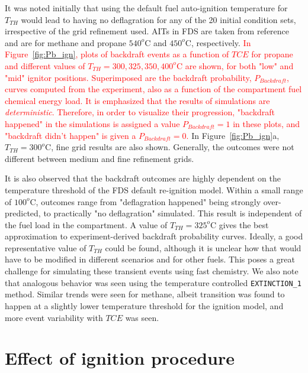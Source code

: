 \documentclass[12pt,letterpaper]{article}
\begin{document}
\begin{flushleft}
It was noted initially that using the default fuel auto-ignition temperature for $T_{TH}$ would lead to having no deflagration for any of the 20 initial condition sets, irrespective of the grid refinement used. AITs in FDS are taken from reference~\cite{SFPE:Beyler} and are for methane and propane $540^o$C and $450^o$C, respectively. 
\textcolor{red}{In Figure~\ref{fig:Pb_ign}, plots of backdraft events as a function of $TCE$ for propane and different values of $T_{TH}=300,325,350,400^o$C are shown, for both "low" and "mid" ignitor positions. Superimposed are the backdraft probability, $P_{Backdraft}$, curves computed from the experiment, also as a function of the compartment fuel chemical energy load. It is emphasized that the results of simulations are \textit{deterministic}. Therefore, in order to visualize their progression, "backdraft happened" in the simulations is assigned a value $P_{Backdraft}=1$ in these plots, and "backdraft didn't happen" is given a $P_{Backdraft}=0$.} In Figure~\ref{fig:Pb_ign}a,  $T_{TH}=300^o$C, fine grid results are also shown. Generally, the outcomes were not different between medium and fine refinement grids.

It is also observed that the backdraft outcomes are highly dependent on the temperature threshold of the FDS default re-ignition model. Within a small range of $100^o$C, outcomes range from "deflagration happened" being strongly over-predicted, to practically "no deflagration" simulated. This result is independent of the fuel load in the compartment. A value of $T_{TH}=325^o$C gives the best approximation to experiment-derived backdraft probability curves. 
Ideally, a good representative value of $T_{TH}$ could be found, although it is unclear how that would have to be modified in different scenarios and for other fuels. This poses a great challenge for simulating these transient events using fast chemistry. We also note that analogous behavior was seen using the temperature controlled \texttt{EXTINCTION\_1} method.
Similar trends were seen for methane, albeit transition was found to happen at a slightly lower temperature threshold for the ignition model, and more event variability with $TCE$ was seen. 

\section{Effect of ignition procedure}
\label{sec:ign_proc}


\end{flushleft}
\end{document}
